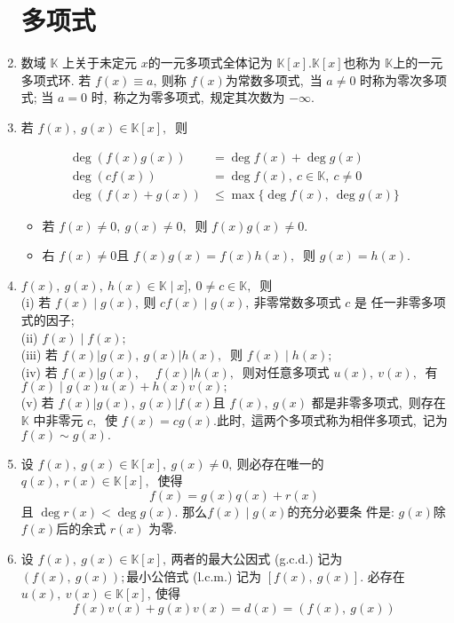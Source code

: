\begin{enumerate}
		\section{多项式}
		\item 数域 $ \mathbb{K} $ 上关于未定元  $x  $的一元多项式全体记为  $\mathbb{K}[x] . \mathbb{K}[x]  $也称为  $\mathbb{K}  $上的一元多项式环. 若 $ f(x) \equiv a ,\  $则称 $ f(x)  $为常数多项式,\  当  $a \neq 0 $ 时称为零次多项式; 当  $a=0$  时,\ 称之为零多项式,\  规定其次数为 $ -\infty .$
		
		\item 若  $f(x),\  g(x) \in \mathbb{K}[x] ,\ $ 则
		
		$$\begin{aligned}
			\operatorname{deg}(f(x) g(x)) &=\operatorname{deg} f(x)+\operatorname{deg} g(x) \\
			\operatorname{deg}(c f(x)) &=\operatorname{deg} f(x),\  c \in \mathbb{K},\  c \neq 0 \\
			\operatorname{deg}(f(x)+g(x)) & \leqslant \max \{\operatorname{deg} f(x),\  \operatorname{deg} g(x)\}
		\end{aligned}$$
		
		\begin{itemize}
			\item  若 $ f(x) \neq 0,\  g(x) \neq 0 ,\ $ 则  $f(x) g(x) \neq 0 .$
			\item 右 $ f(x) \neq 0  $且 $ f(x) g(x)=f(x) h(x) ,\ $ 则  $g(x)=h(x) .$
		\end{itemize}
		
		\item  $f(x),\  g(x),\  h(x) \in \mathbb{K} \mid x],\  0 \neq c \in \mathbb{K} ,\ $ 则\\
		(i) 若  $f(x) \mid g(x) ,\  $则  $c f(x) \mid g(x) ,\  $非零常数多项式  $c $ 是 任一非零多项式的因子;\\
		(ii)  $f(x) \mid f(x) ;$\\
		(iii) 若  $f(x)|g(x),\  g(x)| h(x) ,\ $ 则 $ f(x) \mid h(x) ;$\\
		(iv) 若  $f(x)|g(x),\  \quad f(x)| h(x) ,\ $ 则对任意多项式  $u(x),\  v(x) ,\ $ 有$  f(x) \mid g(x) u(x)+h(x) v(x) ;$\\
		(v) 若 $ f(x)|g(x),\  g(x)| f(x)  $且 $ f(x),\  g(x) $ 都是非零多项式,\  则存在  $\mathbb{K} $ 中非零元 $ c ,\ $ 使 $ f(x)=c g(x) . $此时,\  這两个多项式称为相伴多项式,\  记为$  f(x) \sim g(x) .$
		\item 设 $ f(x),\  g(x) \in \mathbb{K}[x],\  g(x) \neq 0 ,\  $则必存在唯一的  $q(x),\  r(x) \in \mathbb{K}[x] ,\ $ 使得
		$$f(x)=g(x) q(x)+r(x)$$
		且 $ \operatorname{deg} r(x)<\operatorname{deg} g(x) .$ 那么$  f(x) \mid g(x)  $的充分必要条 件是: $ g(x)  $除  $f(x)  $后的余式 $ r(x)$  为零.
		\item 设 $ f(x),\  g(x) \in \mathbb{K}[x] ,\  $两者的最大公因式 (g.c.d.) 记为 $ (f(x),\  g(x)) ;$最小公倍式 (l.c.m.) 记为  $[f(x),\  g(x)] .$
		必存在 $ u(x),\  v(x) \in \mathbb{K}[x] ,\  $使得
		$$f(x) v(x)+g(x) v(x)=d(x)=(f(x),\  g(x))$$
		

\end{enumerate}

